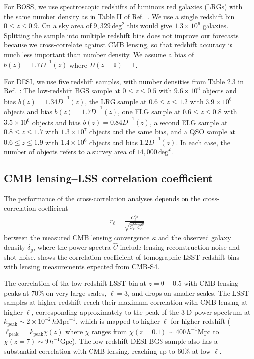 \documentclass[prd,superscriptaddress,floatfix,notitlepage,nofootinbib,reprint]{revtex4-1} %
\begin{document}
For BOSS, we use spectroscopic redshifts of luminous red galaxies (LRGs) with the same number density as in Table II of Ref.~\cite{FontRibera1308}. 
We use a single redshift bin $0\le z\le 0.9$.
On a sky area of $9,329\,\mathrm{deg}^2$ this would give $1.3\times 10^6$ galaxies. Splitting the sample into multiple redshift bins does not improve our forecasts because we cross-correlate against CMB lensing, so that redshift accuracy is much less important than number density.
We assume a bias of $b(z)=1.7\bar D^{-1}(z)$ where $\bar D(z=0)=1$.

For DESI, we use five redshift samples, with number densities from Table 2.3 in Ref.~\cite{DESIFDRDoc}: The low-redshift BGS sample at $0\le z\le 0.5$ with $9.6\times 10^6$ objects and bias $b(z)=1.34\bar D^{-1}(z)$, the LRG sample at $0.6\le z \le 1.2$ with $3.9\times 10^6$ objects and bias $b(z)=1.7\bar D^{-1}(z)$, one ELG sample at $0.6\le z\le 0.8$ with $3.5\times 10^6$ objects and bias $b(z)=0.84\bar D^{-1}(z)$, a second ELG sample at $0.8\le z\le 1.7$ with $1.3\times 10^7$ objects and the same bias, and a QSO sample at $0.6\le z\le 1.9$ with $1.4\times 10^6$ objects and bias $1.2\bar D^{-1}(z)$.
In each case, the number of objects refers to a survey area of $14,000\,\mathrm{deg}^2$.



\subsection{CMB lensing--LSS correlation coefficient}

The performance of the cross-correlation analyses depends on the cross-correlation coefficient
\begin{align}
  \label{eq:rcc}
  r_\ell = \frac{C_\ell^{\kappa g}}{\sqrt{\hat C_\ell^{\kappa\kappa}\hat C_\ell^{gg}}}
\end{align}
between the measured CMB lensing convergence $\kappa$ and the observed galaxy density $\delta_g$, where the power spectra $\hat C$ include lensing reconstruction noise and shot noise.
 shows the correlation coefficient of tomographic LSST redshift bins with lensing measurements expected from CMB-S4.

The correlation of the low-redshift LSST bin at $z=0-0.5$ with CMB lensing peaks at $70\%$ on very large scales, $\ell=3$, and drops on smaller scales.
The LSST samples at higher redshift reach their maximum correlation with CMB lensing at higher $\ell$, corresponding approximately to the peak of the 3-D power spectrum at $k_\mathrm{peak}\sim 2\times 10^{-2}\,h\mathrm{Mpc}^{-1}$, which is mapped to higher $\ell$ for higher redshift ($\ell_\mathrm{peak}=k_\mathrm{peak}\chi(z)$ where $\chi$ ranges from $\chi(z=0.1)\sim 400\,h^{-1}\mathrm{Mpc}$ to $\chi(z=7)\sim 9\,h^{-1}\mathrm{Gpc}$).
The low-redshift DESI BGS sample also has a substantial correlation with CMB lensing, reaching up to $60\%$ at low $\ell$.
\end{document}
